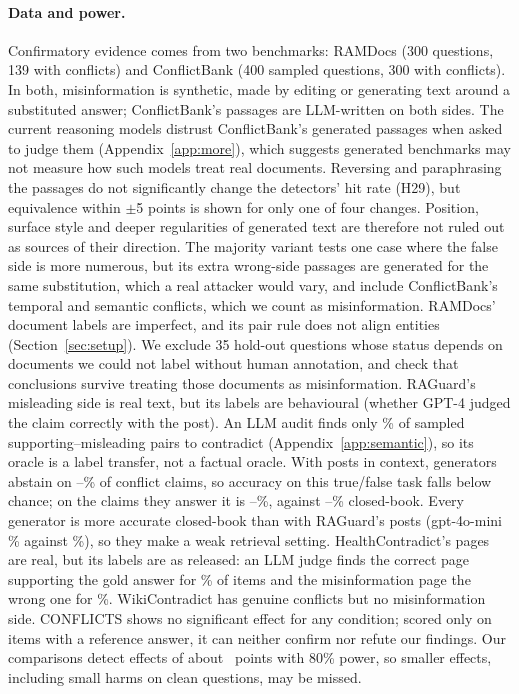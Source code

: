 \paragraph{Data and power.} Confirmatory evidence comes from two benchmarks: RAMDocs (300 questions, 139
with conflicts) and ConflictBank (400 sampled questions, 300 with conflicts). In both, misinformation is
synthetic, made by editing or generating text around a substituted answer; ConflictBank's passages are LLM-written
on both sides. The current reasoning models distrust ConflictBank's generated passages when asked to judge them
(Appendix~\ref{app:more}), which suggests generated benchmarks may not measure how such models treat real
documents. Reversing and paraphrasing the passages do not significantly change the detectors' hit rate (H29), but
equivalence within $\pm$5 points is shown for only one of four changes. Position, surface style and deeper regularities of generated text are therefore
not ruled out as sources of their direction. The majority variant tests one
case where the false side is more numerous, but its extra wrong-side passages are generated for the same substitution,
which a real attacker would vary, and include ConflictBank's temporal and semantic conflicts, which we count as
misinformation. RAMDocs' document labels are imperfect, and its pair rule does not align entities
(Section~\ref{sec:setup}). We exclude 35 hold-out questions whose status depends on
documents we could not label without human annotation, and check that conclusions survive treating those
documents as misinformation. RAGuard's misleading side is real text, but its labels are behavioural (whether GPT-4
judged the claim correctly with the post). An LLM audit finds only \rgAudContradict\% of sampled supporting--misleading
pairs to contradict (Appendix~\ref{app:semantic}), so its oracle is a label transfer, not a factual oracle. With
posts in context, generators abstain on \rgAbstMin--\rgAbstMax\% of conflict claims, so accuracy on this
true/false task falls below chance; on the claims they answer it is \rgAnsMin--\rgAnsMax\%, against
\rgCbMin--\rgCbMax\% closed-book. Every generator is more accurate closed-book than with RAGuard's posts
(gpt-4o-mini \zcRgMiniConflict\% against \zpRgMiniConflict\%), so they make a weak retrieval setting.
HealthContradict's pages are real, but its labels are as released: an LLM judge finds the correct page supporting
the gold answer for \hcLabCorrect\% of items and the misinformation page the wrong one for \hcLabMis\%.
WikiContradict has genuine conflicts but no misinformation side. CONFLICTS shows no significant effect for any
condition; scored only on items with a reference answer, it can neither confirm nor refute our findings. Our
comparisons detect effects of about \mdeMed\ points with 80\% power, so smaller effects, including small harms on clean
questions, may be missed.

